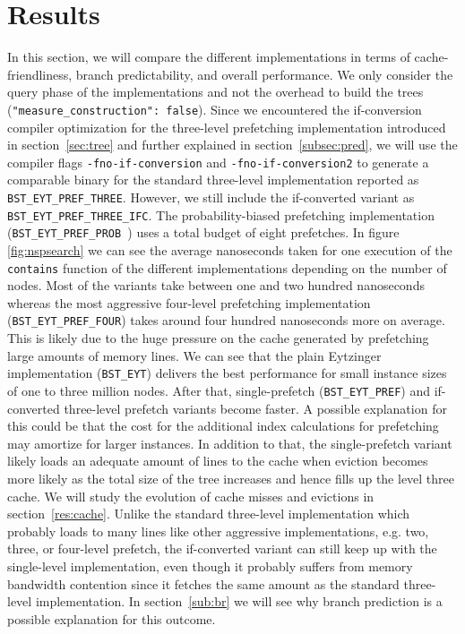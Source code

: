 \documentclass{article}
\begin{document}
\section{Results}
\label{sec:res}
In this section, we will compare the different implementations in terms of cache-friendliness, branch predictability, and overall performance. We only consider the query phase of the implementations and not the overhead to build the trees (\texttt{"measure\_construction": false}). Since we encountered the if-conversion compiler optimization for the three-level prefetching implementation introduced in section~\ref{sec:tree} and further explained in section~\ref{subsec:pred}, we will use the compiler flags \texttt{-fno-if-conversion} and \texttt{-fno-if-conversion2} to generate a comparable binary for the standard three-level implementation reported as \texttt{BST\_EYT\_PREF\_THREE}. However, we still include the if-converted variant as \texttt{BST\_EYT\_PREF\_THREE\_IFC}. The probability-biased prefetching implementation (\texttt{BST\_EYT\_PREF\_PROB }) uses a total budget of eight prefetches. In figure \ref{fig:nspsearch} we can see the average nanoseconds taken for one execution of the \texttt{contains} function of the different implementations depending on the number of nodes. Most of the variants take between one and two hundred nanoseconds whereas the most aggressive four-level prefetching implementation (\texttt{BST\_EYT\_PREF\_FOUR}) takes around four hundred nanoseconds more on average. This is likely due to the huge pressure on the cache generated by prefetching large amounts of memory lines. We can see that the plain Eytzinger implementation (\texttt{BST\_EYT}) delivers the best performance for small instance sizes of one to three million nodes. After that, single-prefetch (\texttt{BST\_EYT\_PREF}) and if-converted three-level prefetch variants become faster. A possible explanation for this could be that the cost for the additional index calculations for prefetching may amortize for larger instances. In addition to that, the single-prefetch variant likely loads an adequate amount of lines to the cache when eviction becomes more likely as the total size of the tree increases and hence fills up the level three cache. We will study the evolution of cache misses and evictions in section~\ref{res:cache}. Unlike the standard three-level implementation which probably loads to many lines like other aggressive implementations, e.g. two, three, or four-level prefetch, the if-converted variant can still keep up with the single-level implementation, even though it probably suffers from memory bandwidth contention since it fetches the same amount as the standard three-level implementation. In section~\ref{sub:br} we will see why branch prediction is a possible explanation for this outcome.  

\end{document}
